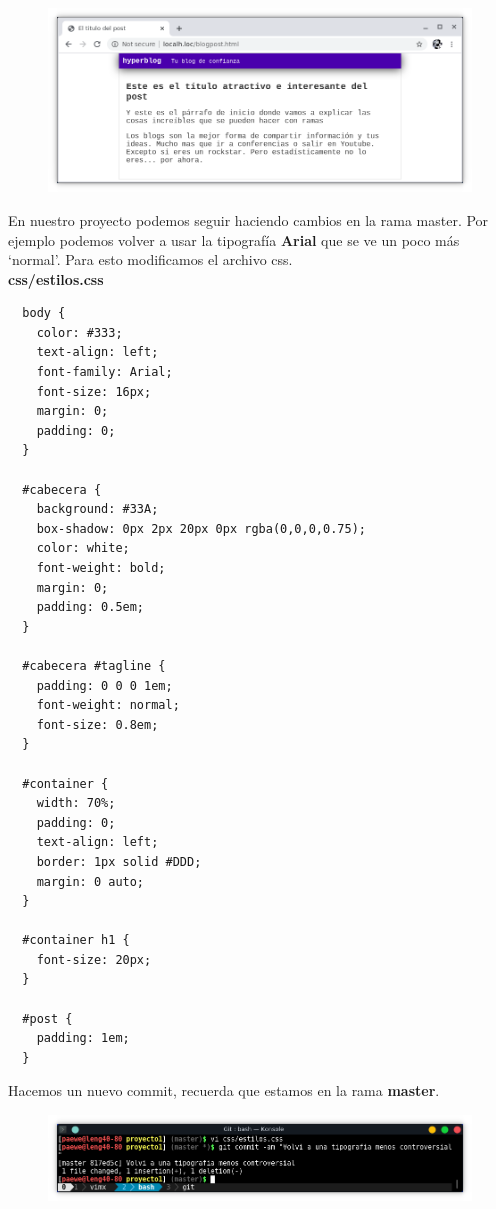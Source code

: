 \documentclass{article}
\begin{document}
\newpage

\begin{figure}[h!]
  \centering
  \includegraphics[scale=0.75]{./Pictures/163_web_merge.png}
\end{figure}

En nuestro proyecto podemos seguir haciendo cambios en la rama master. Por
ejemplo podemos volver a usar la tipografía \textbf{Arial} que se ve un poco
más `normal'. Para esto modificamos el archivo css.\\

\textbf{css/estilos.css}
\begin{verbatim}
  body {
    color: #333;
    text-align: left;
    font-family: Arial;
    font-size: 16px;
    margin: 0;
    padding: 0;
  }

  #cabecera {
    background: #33A;
    box-shadow: 0px 2px 20px 0px rgba(0,0,0,0.75);
    color: white;
    font-weight: bold;
    margin: 0;
    padding: 0.5em;
  }

  #cabecera #tagline {
    padding: 0 0 0 1em;
    font-weight: normal;
    font-size: 0.8em;
  }

  #container {
    width: 70%;
    padding: 0;
    text-align: left;
    border: 1px solid #DDD;
    margin: 0 auto;
  }

  #container h1 {
    font-size: 20px;
  }

  #post {
    padding: 1em;
  }
\end{verbatim}

Hacemos un nuevo commit, recuerda que estamos en la rama \textbf{master}.

\begin{figure}[h!]
  \centering
  \includegraphics[scale=0.75]{./Pictures/164_nuevo_commit.png}
\end{figure}
\end{document}
